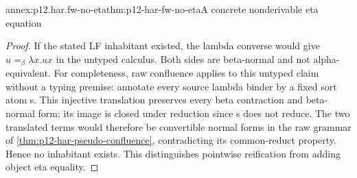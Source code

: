 \begin{annexitem}{annex:p12.har.fw-no-eta}{thm:p12-har-fw-no-eta}{A concrete nonderivable eta equation}
\begin{proof}
If the stated LF inhabitant existed, the lambda converse would give
\(u=_\beta\lambda x.ux\) in the untyped calculus. Both sides
are beta-normal and not alpha-equivalent. For completeness, raw
confluence applies to this untyped claim without a typing premise:
annotate every source lambda binder by a fixed sort atom s. This
injective translation preserves every beta contraction and beta-normal
form; its image is closed under reduction since s does not reduce.
The two translated terms would therefore be convertible normal forms
in the raw grammar of \cref{thm:p12-har-pseudo-confluence}, contradicting
its common-reduct property. Hence no inhabitant exists. This distinguishes
pointwise reification from adding object eta equality.
\end{proof}
\end{annexitem}

